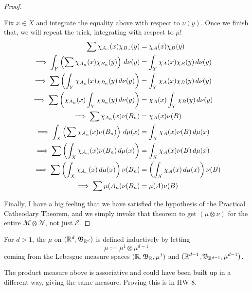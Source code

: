 \documentclass[11pt,leqno,oneside]{amsbook}
\numberwithin{thm}{section}
\newcommand{\M}{\mathcal{M}}
\newcommand{\E}{\mathcal{E}}
\newcommand{\cN}{\mathcal{N}}
\newcommand{\ox}{\otimes}
\begin{document}
\begin{proof}
\begin{enumerate}[label=(\arabic{*})]
\begin{itemize}
      Fix $x \in X$ and integrate the equality above with respect to
      $\nu(y)$.  Once we finish that, we will repeat the trick, integrating with respect to $\mu$!
      \begin{align*}
        \sum \chi_{A_n}(x)\chi_{B_n}(y) &= \chi_A(x)\chi_B(y) \\
        \implies \int_Y\left(\sum \chi_{A_n}(x)\chi_{B_n}(y)\right)\, d\nu(y) &= \int_Y \chi_A(x)\chi_B(y) \, d\nu(y) \\
        \implies \sum \left(\int_Y\chi_{A_n}(x)\chi_{B_n}(y)\, d\nu(y)\right) &= \int_Y \chi_A(x)\chi_B(y) \, d\nu(y) \\
        \implies \sum \left(\chi_{A_n}(x)\int_Y\chi_{B_n}(y)\, d\nu(y)\right) &= \chi_A(x)\int_Y \chi_B(y) \, d\nu(y) \\
        \implies \sum \chi_{A_n}(x)\nu(B_n) &= \chi_A(x)\nu(B) \\
        \implies \int_X \left(\sum \chi_{A_n}(x)\nu(B_n)\right) \, d\mu(x) &= \int_X \chi_A(x)\nu(B)\, d\mu(x) \\
        \implies \sum \left(\int_X \chi_{A_n}(x)\nu(B_n) \, d\mu(x)\right) &= \int_X \chi_A(x)\nu(B)\, d\mu(x) \\
        \implies \sum \left(\int_X \chi_{A_n}(x) \, d\mu(x)\right)\nu(B_n) &= \left(\int_X \chi_A(x)\, d\mu(x)\right)\nu(B) \\
        \implies \sum \mu(A_n)\nu(B_n) &= \mu(A)\nu(B)
      \end{align*}
    \end{itemize}
  \end{enumerate}
  Finally, I have a big feeling that we have satisfied the hypothesis of the Practical Catheodary Theorem, and we simply invoke that theorem to get $(\mu\ox\nu)$ for the entire $\M\ox\cN$, not just $\E$.
\end{proof}
\begin{defn}
  For $d > 1$, the  $\mu$ on $({\mathbb R}^d, \mathfrak{B}_{{\mathbb R}^d})$ is defined inductively by letting $$\mu := \mu^1 \ox \mu^{d-1}$$ coming from the Lebesgue measure spaces $({\mathbb R}, \mathfrak{B}_{{\mathbb R}}, \mu^1)$ and $({\mathbb R}^{d-1}, \mathfrak{B}_{{\mathbb R}^{d-1}}, \mu^{d-1})$.
\end{defn}
\begin{thm}
  The product measure above is associative and could have been built up in a different way, giving the same measure.  Proving this is in HW 8.
\end{thm}
\end{document}
